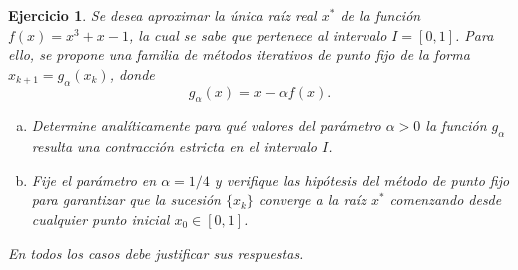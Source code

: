 \documentclass[12pt]{article}%
\newtheorem{exercise}{Ejercicio}
\begin{document}

\vskip 0.5cm

\begin{exercise}
Se desea aproximar la única raíz real $x^*$ de la función $f(x) = x^3 + x - 1$, la cual se sabe que pertenece al intervalo $I = [0, 1]$. Para ello, se propone una familia de métodos iterativos de punto fijo de la forma $x_{k+1} = g_\alpha(x_k)$, donde $$g_\alpha(x) = x - \alpha f(x).$$
\begin{enumerate}[(a)]
\item Determine analíticamente para qué valores del parámetro $\alpha > 0$ la función $g_\alpha$ resulta una contracción estricta en el intervalo $I$.

\item Fije el parámetro en $\alpha = 1/4$ y verifique las hipótesis del método de punto fijo para garantizar que la sucesión $\{x_k\}$ converge a la raíz $x^*$ comenzando desde cualquier punto inicial $x_0 \in [0, 1]$.

\end{enumerate}
\end{exercise}

\vskip 2.5cm

\begin{center}
    \textit{En todos los casos debe justificar sus respuestas.}
\end{center}
\end{document}
